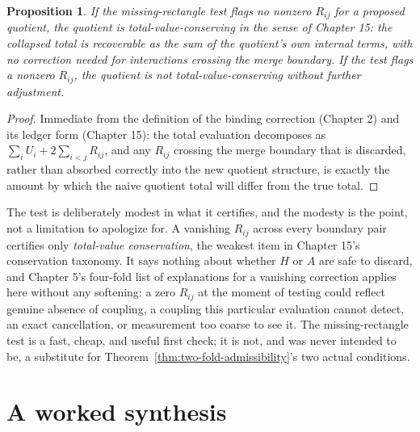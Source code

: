 \documentclass[11pt]{book}
\newtheorem{proposition}[theorem]{Proposition}
\begin{document}
\begin{proposition}
\label{prop:missing-rectangle}
If the missing-rectangle test flags no nonzero $R_{ij}$ for a proposed quotient, the quotient is total-value-conserving in the sense of Chapter 15: the collapsed total is recoverable as the sum of the quotient's own internal terms, with no correction needed for interactions crossing the merge boundary. If the test flags a nonzero $R_{ij}$, the quotient is not total-value-conserving without further adjustment.
\end{proposition}
\begin{proof}
Immediate from the definition of the binding correction (Chapter 2) and its ledger form (Chapter 15): the total evaluation decomposes as $\sum_iU_i+2\sum_{i<j}R_{ij}$, and any $R_{ij}$ crossing the merge boundary that is discarded, rather than absorbed correctly into the new quotient structure, is exactly the amount by which the naive quotient total will differ from the true total.
\end{proof}

The test is deliberately modest in what it certifies, and the modesty is the point, not a limitation to apologize for. A vanishing $R_{ij}$ across every boundary pair certifies only \emph{total-value conservation}, the weakest item in Chapter 15's conservation taxonomy. It says nothing about whether $H$ or $A$ are safe to discard, and Chapter 5's four-fold list of explanations for a vanishing correction applies here without any softening: a zero $R_{ij}$ at the moment of testing could reflect genuine absence of coupling, a coupling this particular evaluation cannot detect, an exact cancellation, or measurement too coarse to see it. The missing-rectangle test is a fast, cheap, and useful first check; it is not, and was never intended to be, a substitute for Theorem~\ref{thm:two-fold-admissibility}'s two actual conditions.

\section{A worked synthesis}
\end{document}
